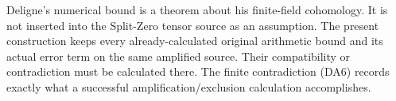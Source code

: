 Deligne's numerical bound is a theorem about his finite-field
cohomology. It is not inserted into the Split-Zero tensor source as an
assumption. The present construction keeps every already-calculated
original arithmetic bound and its actual error term on the same
amplified source. Their compatibility or contradiction must be
calculated there. The finite contradiction (DA6) records exactly what a
successful amplification/exclusion calculation accomplishes.
